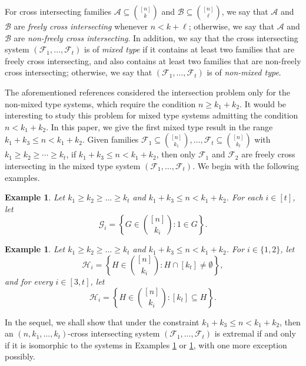 \documentclass[a4paper,11pt]{article}
\newtheorem{example}[theorem]{Example}
\begin{document}
\fi



For cross intersecting families $\mathcal{A}\subseteq {[n]\choose k}$ and
$\mathcal{B}\subseteq {[n]\choose \ell}$,
 we say that $\mathcal{A}$ and $\mathcal{B}$ are  {\it freely cross intersecting} whenever $n<k+\ell$; otherwise, we say that $\mathcal{A}$ and $\mathcal{B}$ are  {\it non-freely cross intersecting}.
 In addition, we say that the cross intersecting system $(\mathcal{F}_1,\ldots , \mathcal{F}_t)$  is of {\em mixed type} if it contains at least two families that are freely cross intersecting, and also contains at least two families that are non-freely cross intersecting; otherwise, we say that $(\mathcal{F}_1,\ldots , \mathcal{F}_t)$  is of {\em non-mixed type}.

The aforementioned references considered the intersection problem only for the non-mixed type systems, which require the condition $ n \ge k_1+k_2$.
It would be interesting  to study this problem for mixed type systems admitting the condition $n< k_1 + k_2$.
In this paper, we give the first mixed type result in the range $k_1+k_3\leq n <k_1+k_2$.
Given families $\mathcal{F}_1\subseteq {[n] \choose k_1}, \ldots , \mathcal{F}_t \subseteq {[n] \choose k_t}$ with
$k_1\geq k_2 \ge \cdots \geq k_t$, if $k_1+k_3\leq n <k_1+k_2$, then only
$\mathcal{F}_1$ and $\mathcal{F}_2$ are freely cross intersecting in the mixed type system $(\mathcal{F}_1,\ldots ,\mathcal{F}_t)$.
We begin with the following examples.



\begin{example}\label{con1}
Let $k_1\geq k_2\geq\dots\geq k_t$ and $k_1+k_3\leq n <k_1+k_2$. For each $i\in [t]$,  let
$$\mathcal{G}_i=\left\{ G\in {[n]\choose k_i}: 1\in G \right\}.$$
\end{example}

\begin{example}\label{con2}
Let $k_1\geq k_2\geq\dots\geq k_t$ and $k_1+k_3\leq n <k_1+k_2$.  For $i\in \{1,2\}$, let
$$\mathcal{H}_i=\left\{ H\in {[n]\choose k_i}: H\cap [k_t]\ne\emptyset \right\},$$
and for every $i\in[3, t]$, let
$$\mathcal{H}_i=\left\{ H\in {[n]\choose k_i}: [k_t]\subseteq H\right\}.$$
\end{example}

In the sequel, we shall show that under the constraint $k_1+k_3\leq n<k_1+k_2$, then an  $(n, k_1, \dots, k_t)$-cross intersecting system $(\mathcal{F}_1,\ldots ,\mathcal{F}_t)$ is extremal  if and only if it is isomorphic to the systems in Examples \ref{con1} or  \ref{con2}, with one more exception possibly.
\end{document}
